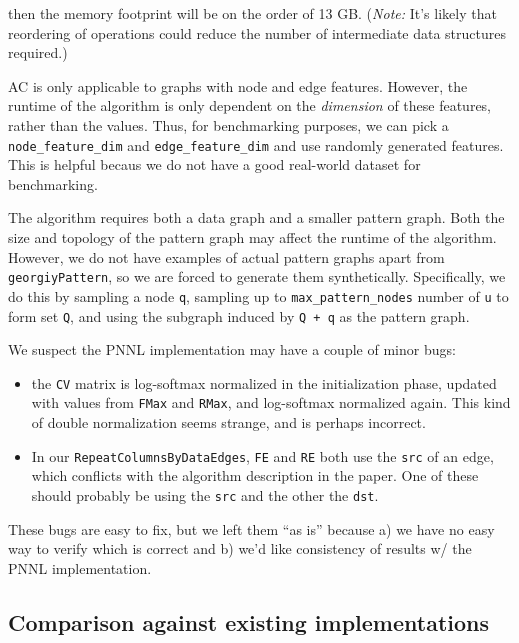 \documentclass[10pt,oneside]{memoir}
\providecommand{\tightlist}{%
  \setlength{\itemsep}{0pt}\setlength{\parskip}{0pt}}
\begin{document}
then the memory footprint will be on the order of 13 GB. (\emph{Note:}
It's likely that reordering of operations could reduce the number of
intermediate data structures required.)

AC is only applicable to graphs with node and edge features. However,
the runtime of the algorithm is only dependent on the \emph{dimension}
of these features, rather than the values. Thus, for benchmarking
purposes, we can pick a \texttt{node\_feature\_dim} and
\texttt{edge\_feature\_dim} and use randomly generated features. This is
helpful becaus we do not have a good real-world dataset for
benchmarking.

The algorithm requires both a data graph and a smaller pattern graph.
Both the size and topology of the pattern graph may affect the runtime
of the algorithm. However, we do not have examples of actual pattern
graphs apart from \texttt{georgiyPattern}, so we are forced to generate
them synthetically. Specifically, we do this by sampling a node
\texttt{q}, sampling up to \texttt{max\_pattern\_nodes} number of
\texttt{u} to form set \texttt{Q}, and using the subgraph induced by
\texttt{Q\ +\ q} as the pattern graph.

We suspect the PNNL implementation may have a couple of minor bugs:

\begin{itemize}
\tightlist
\item
  the \texttt{CV} matrix is log-softmax normalized in the initialization
  phase, updated with values from \texttt{FMax} and \texttt{RMax}, and
  log-softmax normalized again. This kind of double normalization seems
  strange, and is perhaps incorrect.
\item
  In our \texttt{RepeatColumnsByDataEdges}, \texttt{FE} and \texttt{RE}
  both use the \texttt{src} of an edge, which conflicts with the
  algorithm description in the paper. One of these should probably be
  using the \texttt{src} and the other the \texttt{dst}.
\end{itemize}

These bugs are easy to fix, but we left them ``as is'' because a) we
have no easy way to verify which is correct and b) we'd like consistency
of results w/ the PNNL implementation.

\hypertarget{comparison-against-existing-implementations}{%
\subsection{Comparison against existing
implementations}\label{comparison-against-existing-implementations}}
\end{document}
